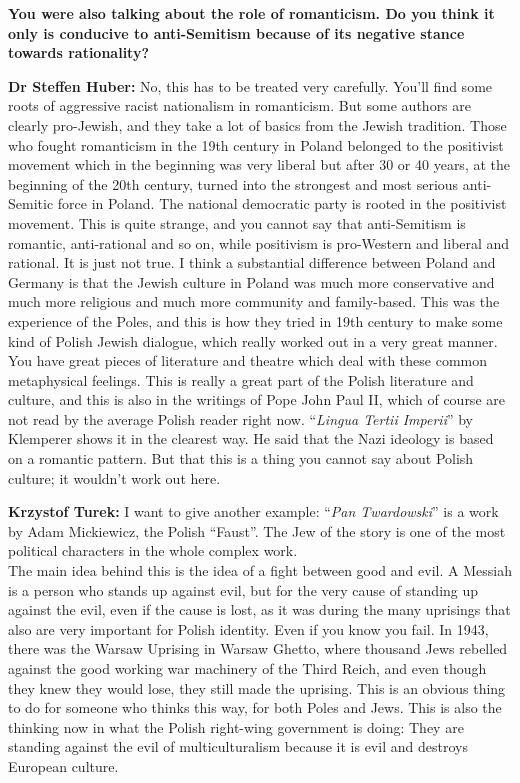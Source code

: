 \textbf{You were also talking about the role of romanticism. Do you think it only is conducive to anti-Semitism because of its negative stance towards rationality?} 

\textbf{Dr Steffen Huber:} No, this has to be treated very carefully. You’ll find some roots of aggressive racist nationalism in romanticism. But some authors are clearly pro-Jewish, and they take a lot of basics from the Jewish tradition. Those who fought romanticism in the 19th century in Poland belonged to the positivist movement which in the beginning was very liberal but after 30 or 40 years, at the beginning of the 20th century, turned into the strongest and most serious anti-Semitic force in Poland. The national democratic party is rooted in the positivist movement. This is quite strange, and you cannot say that anti-Semitism is romantic, anti-rational and so on, while positivism is pro-Western and liberal and rational. It is just not true. I think a substantial difference between Poland and Germany is that the Jewish culture in Poland was much more conservative and much more religious and much more community and family-based. This was the experience of the Poles, and this is how they tried in 19th century to make some kind of Polish Jewish dialogue, which really worked out in a very great manner. You have great pieces of literature and theatre which deal with these common metaphysical feelings. This is really a great part of the Polish literature and culture, and this is also in the writings of Pope John Paul II, which of course are not read by the average Polish reader right now. ``\textit{Lingua Tertii Imperii}'' by Klemperer shows it in the clearest way. He said that the Nazi ideology is based on a romantic pattern. But that this is a thing you cannot say about Polish culture; it wouldn't work out here.\par 
\textbf{Krzystof Turek:} I want to give another example: ``\textit{Pan Twardowski}'' is a work by Adam Mickiewicz, the Polish ``Faust''. The Jew of the story is one of the most political characters in the whole complex work.\\
The main idea behind this is the idea of a fight between good and evil. A Messiah is a person who stands up against evil, but for the very cause of standing up against the evil, even if the cause is lost, as it was during the many uprisings that also are very important for Polish identity. Even if you know you fail. In 1943, there was the Warsaw Uprising in Warsaw Ghetto, where thousand Jews rebelled against the good working war machinery of the Third Reich, and even though they knew they would lose, they still made the uprising. This is an obvious thing to do for someone who thinks this way, for both Poles and Jews. This is also the thinking now in what the Polish right-wing government is doing: They are standing against the evil of multiculturalism because it is evil and destroys European culture.\par

